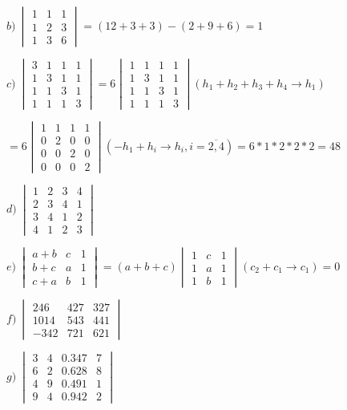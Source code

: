 \documentclass[12pt]{report}
\begin{document}
$b)\ \begin{vmatrix} 1 & 1 & 1 \\ 1 & 2 & 3 \\ 1 & 3 & 6 \end{vmatrix} = (12 + 3 + 3) - (2 + 9 + 6) = 1$

$c)\ \begin{vmatrix} 3 & 1 & 1 & 1 \\ 1 & 3 & 1 & 1 \\ 1 & 1 & 3 & 1 \\ 1 & 1 & 1 & 3 \end{vmatrix} = 6\begin{vmatrix} 1 & 1 & 1 & 1 \\ 1 & 3 & 1 & 1 \\ 1 & 1 & 3 & 1 \\ 1 & 1 & 1 & 3 \end{vmatrix}(h_1 + h_2 + h_3 + h_ 4 \to h_1)$

$= 6\begin{vmatrix} 1 & 1 & 1 & 1 \\ 0 & 2 & 0 & 0 \\ 0 & 0 & 2 & 0 \\ 0 & 0 & 0 & 2 \end{vmatrix}(-h_1 + h_i \to h_i, i=\overline{2,4}) = 6*1*2*2*2 = 48$

$d)\ \begin{vmatrix} 1 & 2 & 3 & 4 \\ 2 & 3 & 4 & 1 \\ 3 & 4 & 1 & 2 \\ 4 & 1 & 2 & 3 \end{vmatrix}$

$e)\ \begin{vmatrix} a+b & c & 1 \\ b+c & a & 1 \\ c+a & b & 1 \end{vmatrix} = (a + b + c)\begin{vmatrix} 1 & c & 1 \\ 1 & a & 1 \\ 1 & b & 1 \end{vmatrix}(c_2 + c_1 \to c_1) = 0$

$f)\ \begin{vmatrix} 246 & 427 & 327 \\ 1014 & 543 & 441 \\ -342 & 721 & 621 \end{vmatrix}$

$g)\ \begin{vmatrix} 3 & 4 & 0.347 & 7 \\ 6 & 2 & 0.628 & 8 \\ 4 & 9 & 0.491 & 1 \\ 9 & 4 & 0.942 & 2 \end{vmatrix}$
\end{document}
